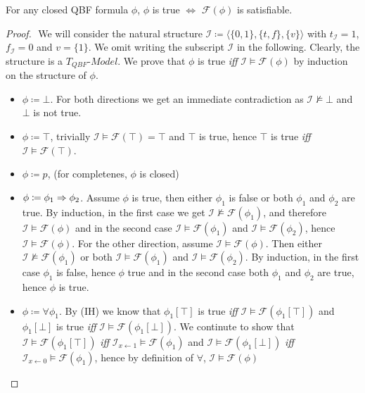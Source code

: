 \begin{lemma}
  For any closed QBF formula $\phi$, $\phi$ is true $\iff$ $\mathcal{F}(\phi)$ is satisfiable.
\end{lemma}
\begin{proof}$ $
  We will consider the natural structure $\mathcal{I} \coloneqq \langle \{0, 1\}, \{t,f\}, \{v\}\rangle$ with $t_{\mathcal{I}} = 1$, $f_\mathcal{I} = 0$ and $v = \{1\}$. We omit writing the subscript $\mathcal{I}$ in the following. Clearly, the structure is a $T_{QBF}$-$Model$. We prove that $\phi$ is true \emph{iff} $\mathcal{I} \models \mathcal{F}(\phi)$ by induction on the structure of $\phi$.
  \begin{itemize}
    \item $\phi \coloneqq \bot$. For both directions we get an immediate contradiction as $\mathcal{I} \not\models \bot$ and $\bot$ is not true.
    \item $\phi \coloneqq \top$, trivially $\mathcal{I} \models \mathcal{F}(\top) = \top$ and $\top$ is true, hence $\top$ is true \emph{iff} $\mathcal{I} \models \mathcal{F}(\top)$.
    \item $\phi \coloneqq p$, (for completenes, $\phi$ is closed)
    \item $\phi \coloneqq \phi_1 \Rightarrow \phi_2$. Assume $\phi$ is true, then either $\phi_1$ is false or both $\phi_1$ and $\phi_2$ are true. By induction, in the first case we get $\mathcal{I} \not\models \mathcal{F}(\phi_1)$, and therefore $\mathcal{I} \models \mathcal{F}(\phi)$ and in the second case $\mathcal{I} \models \mathcal{F}(\phi_1)$ and $\mathcal{I} \models \mathcal{F}(\phi_2)$, hence $\mathcal{I} \models \mathcal{F}(\phi)$. For the other direction, assume $\mathcal{I} \models \mathcal{F}(\phi)$. Then either $\mathcal{I} \not\models \mathcal{F}(\phi_1)$ or both $\mathcal{I} \models \mathcal{F}(\phi_1)$ and $\mathcal{I} \models \mathcal{F}(\phi_2)$. By induction, in the first case $\phi_1$ is false, hence $\phi$ true and in the second case both $\phi_1$ and $\phi_2$ are true, hence $\phi$ is true.
    \item $\phi \coloneqq \forall \phi_1$. By (IH) we know that $\phi_1[\top]$ is true \emph{iff} $\mathcal{I} \models \mathcal{F}(\phi_1[\top])$ and $\phi_1[\bot]$ is true \emph{iff} $\mathcal{I} \models \mathcal{F}(\phi_1[\bot])$.
    We continute to show that $\mathcal{I} \models \mathcal{F}(\phi_1[\top])$ \emph{iff} $\mathcal{I}_{x \gets 1} \models \mathcal{F}(\phi_1)$ and $\mathcal{I} \models \mathcal{F}(\phi_1[\bot])$ \emph{iff} $\mathcal{I}_{x \gets 0} \models \mathcal{F}(\phi_1)$, hence by definition of $\forall$, $\mathcal{I} \models \mathcal{F}(\phi)$

\end{itemize}
\end{proof}
